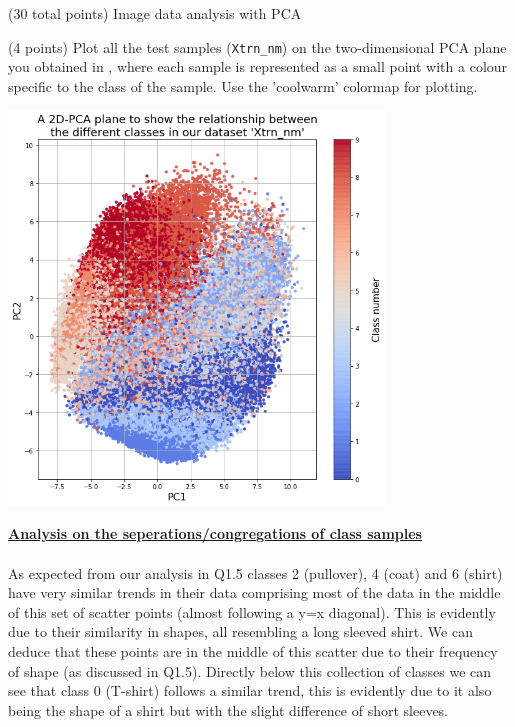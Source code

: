 \documentclass[12pt]{article}
\begin{document}
\begin{question}{(30 total points) Image data analysis with PCA}
\begin{subquestion}
   \end{subquestion}
   \begin{subquestion}{(4 points)
       Plot all the test samples (\texttt{Xtrn\_nm}) on the
       two-dimensional PCA plane you obtained in , where each sample is
       represented as a small point with a colour specific to the class of
       the sample.  Use the 'coolwarm' colormap for plotting.
     } \label{Q1.8}


   

      \begin{answerbox}{51.75em}
        \begin{center}
        \includegraphics[width=0.75\textwidth]{images/q18.png}
        \end{center}
        \footnotesize{\textbf{\underline{Analysis on the seperations/congregations of class samples}}}\\
        \\
        \scriptsize{
        As expected from our analysis in Q1.5 classes 2 (pullover), 4 (coat) and 6 (shirt) have very similar trends in their data comprising most of the data in the middle of this set of scatter points (almost following a y=x diagonal). This is evidently due to their similarity in shapes, all resembling a long sleeved shirt. We can deduce that these points are in the middle of this scatter due to their frequency of shape (as discussed in Q1.5). Directly below this collection of classes we can see that class 0 (T-shirt) follows a similar trend, this is evidently due to it also being the shape of a shirt but with the slight difference of short sleeves.\\
}
\end{answerbox}
\end{subquestion}
\end{question}
\end{document}
